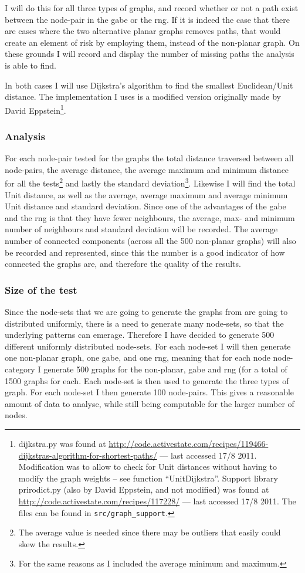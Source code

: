I will do this for all three types of graphs, and record whether or not a path exist between the node-pair in the \ac{gabe} or the \ac{rng}. If it is indeed the case that there are cases where the two alternative planar graphs removes paths, that would create an element of risk by employing them, instead of the non-planar graph. On these grounds I will record and display the number of missing paths the analysis is able to find.

In both cases I will use Dijkstra's algorithm to find the smallest Euclidean/Unit distance. The implementation I uses is a modified version originally made by David Eppstein\footnote{dijkstra.py was found at \url{http://code.activestate.com/recipes/119466-dijkstras-algorithm-for-shortest-paths/} --- last accessed 17/8 2011. Modification was to allow to check for Unit distances without having to modify the graph weights -- see function ``UnitDijkstra''. Support library prirodict.py (also by David Eppstein, and not modified) was found at \url{http://code.activestate.com/recipes/117228/} --- last accessed 17/8 2011. The files can be found in \texttt{src/graph\_support}.}.

\subsubsection{Analysis}
For each node-pair tested for the graphs the total distance traversed between all node-pairs, the average distance, the average maximum and minimum distance for all the tests\footnote{The average value is needed since there may be outliers that easily could skew the results.} and lastly the standard deviation\footnote{For the same reasons as I included the average minimum and maximum.}. Likewise I will find the total Unit distance, as well as the average, average maximum and average minimum Unit distance and standard deviation. Since one of the advantages of the \ac{gabe} and the \ac{rng} is that they have fewer neighbours, the average, max- and minimum number of neighbours and standard deviation will be recorded. The average number of connected components (across all the 500 non-planar graphs) will also be recorded and represented, since this the number is a good indicator of how connected the graphs are, and therefore the quality of the results.

\subsubsection{Size of the test}
Since the node-sets that we are going to generate the graphs from are going to distributed uniformly, there is a need to generate many node-sets, so that the underlying patterns can emerage. Therefore I have decided to generate 500 different uniformly distributed node-sets. For each node-set I will then generate one non-planar graph, one \ac{gabe}, and one \ac{rng}, meaning that for each node node-category I  generate 500 graphs for the non-planar, \ac{gabe} and \ac{rng} (for a total of 1500 graphs for each. Each node-set is then used to generate the three types of graph. For each node-set I then generate 100 node-pairs. This gives a reasonable amount of data to analyse, while still being computable for the larger number of nodes.

